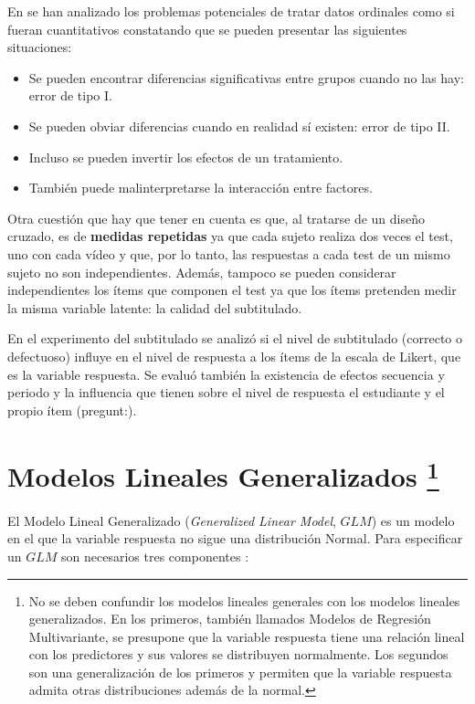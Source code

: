 \documentclass[
  12pt,
  a4paper,
  extrafontsizes,
  onecolumn,
  openright,
  table]{memoir}
\providecommand{\tightlist}{%
  \setlength{\itemsep}{0pt}\setlength{\parskip}{0pt}}\usepackage{longtable,booktabs,array}
\begin{document}
En \textcite{kruschke2018} se han analizado los problemas potenciales de
tratar datos ordinales como si fueran cuantitativos constatando que se
pueden presentar las siguientes situaciones:

\begin{itemize}
\tightlist
\item
  Se pueden encontrar diferencias significativas entre grupos cuando no
  las hay: error de tipo I.
\item
  Se pueden obviar diferencias cuando en realidad sí existen: error de
  tipo II.
\item
  Incluso se pueden invertir los efectos de un tratamiento.
\item
  También puede malinterpretarse la interacción entre factores.
\end{itemize}

Otra cuestión que hay que tener en cuenta es que, al tratarse de un
diseño cruzado, es de \textbf{medidas repetidas} ya que cada sujeto
realiza dos veces el test, uno con cada vídeo y que, por lo tanto, las
respuestas a cada test de un mismo sujeto no son independientes. Además,
tampoco se pueden considerar independientes los ítems que componen el
test ya que los ítems pretenden medir la misma variable latente: la
calidad del subtitulado.

En el experimento del subtitulado se analizó si el nivel de subtitulado
(correcto o defectuoso) influye en el nivel de respuesta a los ítems de
la escala de Likert, que es la variable respuesta. Se evaluó también la
existencia de efectos secuencia y periodo y la influencia que tienen
sobre el nivel de respuesta el estudiante y el propio ítem (pregunt:).

\hypertarget{sec-glm}{%
\section[Modelos Lineales Generalizados ]{\texorpdfstring{Modelos
Lineales Generalizados
\footnote{No se deben confundir los modelos lineales generales con los
  modelos lineales generalizados. En los primeros, también llamados
  Modelos de Regresión Multivariante, se presupone que la variable
  respuesta tiene una relación lineal con los predictores y sus valores
  se distribuyen normalmente. Los segundos son una generalización de los
  primeros y permiten que la variable respuesta admita otras
  distribuciones además de la normal.}}{Modelos Lineales Generalizados }}\label{sec-glm}}

El Modelo Lineal Generalizado (\emph{Generalized Linear Model}, \(GLM\))
es un modelo en el que la variable respuesta no sigue una distribución
Normal. Para especificar un \(GLM\) son necesarios tres componentes
\autocite[ver][pp.~66-67]{agresti_2018}:
\end{document}
